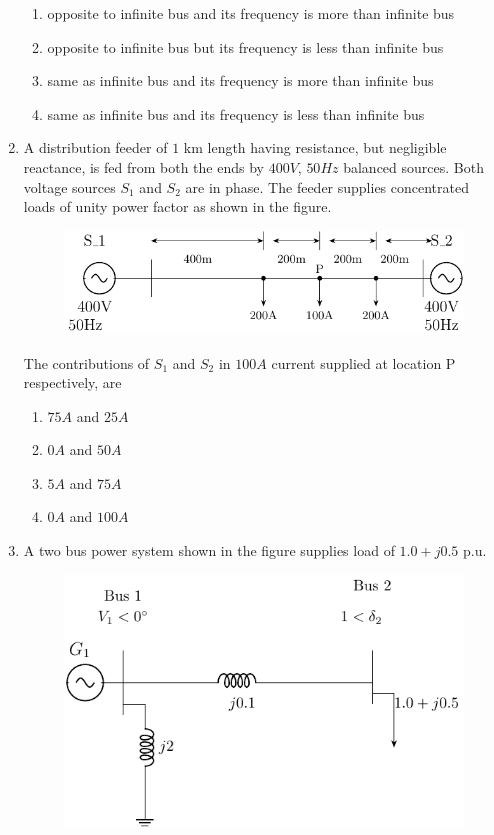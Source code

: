 \documentclass[journal]{IEEEtran}
\begin{document}
\begin{enumerate}
\begin{enumerate}
			\item opposite to infinite bus and its frequency is more than infinite bus
			\item opposite to infinite bus but its frequency is less than infinite bus
			\item same as infinite bus and its frequency is more than infinite bus
			\item same as infinite bus and its frequency is less than infinite bus
        	
         \end{enumerate}		
	\item  A distribution feeder of $1$ km length having resistance, but negligible reactance, is fed from both the
ends by $400V$, $50 Hz$ balanced sources. Both voltage sources $S_1$ and $S_2$ are in phase. The feeder
supplies concentrated loads of unity power factor as shown in the figure.
\begin{figure}[h!]
            \centering
            \includegraphics[width=0.5\linewidth]{fig/fig4.pdf}
        \end{figure}
The contributions of $S_1$ and $S_2$ in $100 A$ current supplied at location P respectively, are
		\begin{enumerate}
			\item $75 A$ and $25 A$
			\item $0 A$ and $50 A$
			\item $5 A$ and $75 A$
			\item$ 0A$ and $100A$
        	\end{enumerate}	
	\item A two bus power system shown in the figure supplies load of $1.0+j0.5$ p.u.
		\begin{figure}[h!]
            \centering
            \includegraphics[width=0.5\linewidth]{fig/fig5.pdf}
        \end{figure}

\end{enumerate}
\end{document}
